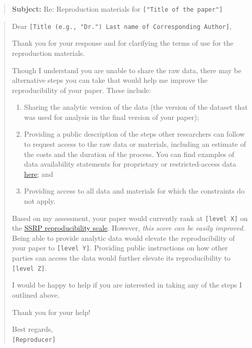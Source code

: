 \documentclass[
  openany]{book}
\providecommand{\tightlist}{%
  \setlength{\itemsep}{0pt}\setlength{\parskip}{0pt}}
\begin{document}
\begin{quote}
\textbf{Subject:} Re: Reproduction materials for \texttt{{[}"Title\ of\ the\ paper"{]}}
\end{quote}

\begin{quote}
Dear \texttt{{[}Title\ (e.g.,\ "Dr.")\ Last\ name\ of\ Corresponding\ Author{]}},

Thank you for your response and for clarifying the terms of use for the reproduction materials.

Though I understand you are unable to share the raw data, there may be alternative steps you can take that would help me improve the reproducibility of your paper. These include:

\begin{enumerate}
\def\labelenumi{\arabic{enumi}.}
\tightlist
\item
  Sharing the analytic version of the data (the version of the dataset that was used for analysis in the final version of your paper);\\
\item
  Providing a public description of the steps other researchers can follow to request access to the raw data or materials, including an estimate of the costs and the duration of the process. You can find examples of data availability statements for proprietary or restricted-access data \href{https://social-science-data-editors.github.io/guidance/Requested_information_dcas.html}{here}; and\\
\item
  Providing access to all data and materials for which the constraints do not apply.
\end{enumerate}

Based on my assessment, your paper would currently rank at \texttt{{[}level\ X{]}} on the \href{https://bitss.github.io/ACRE/assessment.html\#levels-of-computational-reproducibility-for-a-specific-output}{SSRP reproducibility scale}. However, \emph{this score can be easily improved}. Being able to provide analytic data would elevate the reproducibility of your paper to \texttt{{[}level\ Y{]}}. Providing public instructions on how other parties can access the data would further elevate its reproducibility to \texttt{{[}level\ Z{]}}.

I would be happy to help if you are interested in taking any of the steps I outlined above.

Thank you for your help!

Best regards,\\
\texttt{{[}Reproducer{]}}
\end{quote}
\end{document}

